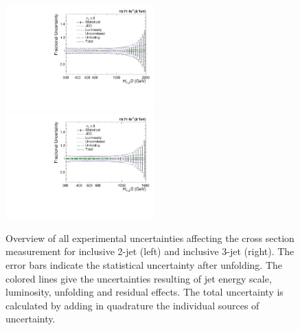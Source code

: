 \begin{figure}[!htbp]
 \begin{center}
 \includegraphics[width=0.51\textwidth]{Plots_HT_2_150/Total_unc_all_2_NLO_add.pdf}%
 ~~\includegraphics[width=0.51\textwidth]{Plots_HT_2_150/Total_unc_all_3_NLO_add.pdf}
 \caption{Overview of all experimental uncertainties affecting the cross section measurement for inclusive 2-jet (left) and inclusive 3-jet (right). The error bars indicate the statistical uncertainty after unfolding. The colored lines give the uncertainties resulting of jet energy scale, luminosity, unfolding and residual effects. The total uncertainty is calculated by adding in quadrature the individual sources of uncertainty.}
 \label{fig:exp_unc}
 \end{center}
\end{figure}

